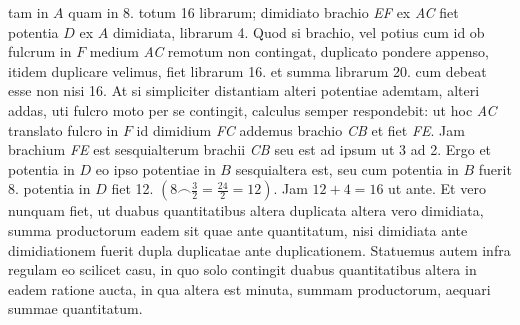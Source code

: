 tam in $A$ quam in
8. totum 16 librarum;
dimidiato brachio\protect{} \textit{EF} ex \textit{AC} fiet
potentia\protect{} $D$ ex $A$ dimidiata, librarum 4. Quod si
brachio,\protect{} vel potius cum id ob fulcrum\protect{} in $F$ medium \textit{AC}
remotum non contingat, duplicato pondere\protect{}
appenso, itidem duplicare velimus, fiet librarum
16. et summa librarum 20. cum debeat esse
non nisi 16. At si simpliciter distantiam alteri
potentiae\protect{} ademtam, alteri addas, uti fulcro\protect{} moto
per se contingit, calculus semper respondebit: ut hoc
\textit{AC} translato fulcro\protect{} in $F$ id dimidium
\textit{FC} addemus brachio\protect{} \textit{CB} et
fiet \textit{FE}. Jam brachium\protect{} \textit{FE} est sesquialterum
brachii \textit{CB} seu est ad ipsum ut 3 ad 2.
Ergo et potentia\protect{} in $D$ eo ipso potentiae\protect{} in $B$
sesquialtera est, seu cum potentia\protect{} in $B$ fuerit
8. potentia in $D$ fiet 12.
$\displaystyle \left(8\smallfrown \frac{3}{2} = \frac{24}{2} =12 \right).$
Jam $\displaystyle 12 + 4 = 16$ ut ante. Et vero nunquam
fiet, ut duabus quantitatibus altera duplicata  
altera vero dimidiata, summa productorum
eadem sit quae ante quantitatum, nisi dimidiata
ante dimidiationem fuerit dupla duplicatae
ante duplicationem. Statuemus autem infra
regulam\protect{}
eo scilicet casu, in quo solo contingit duabus
quantitatibus altera in eadem ratione aucta,
in qua altera est minuta, summam productorum,
aequari summae quantitatum.
\pend

%
